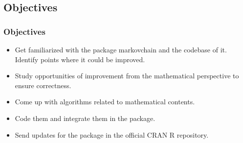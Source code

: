 \subsection{Objectives}
\begin{frame}\frametitle{Objectives}
 \vspace{2em}
  \begin{itemize}
  \item Get familiarized with the package markovchain and the codebase of it. Identify points where it could be improved.
  \item Study opportunities of improvement from the mathematical perspective to ensure correctness.
  \item Come up with algorithms related to mathematical contents.
  \item Code them and integrate them in the package.
  \item Send updates for the package in the official CRAN R repository.
  \end{itemize}
 \end{frame}
